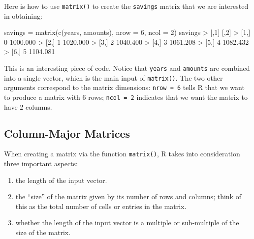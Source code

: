 \documentclass[
]{book}
\newenvironment{Shaded}{\begin{snugshade}}{\end{snugshade}}
\newcommand{\AttributeTok}[1]{\textcolor[rgb]{0.77,0.63,0.00}{#1}}
\newcommand{\DecValTok}[1]{\textcolor[rgb]{0.00,0.00,0.81}{#1}}
\newcommand{\FloatTok}[1]{\textcolor[rgb]{0.00,0.00,0.81}{#1}}
\newcommand{\FunctionTok}[1]{\textcolor[rgb]{0.00,0.00,0.00}{#1}}
\newcommand{\NormalTok}[1]{#1}
\newcommand{\OtherTok}[1]{\textcolor[rgb]{0.56,0.35,0.01}{#1}}
\newcommand{\SpecialCharTok}[1]{\textcolor[rgb]{0.00,0.00,0.00}{#1}}
\begin{document}
Here is how to use \texttt{matrix()} to create the \texttt{savings} matrix that we are
interested in obtaining:

\begin{Shaded}
\begin{Highlighting}[]
\NormalTok{savings }\OtherTok{=} \FunctionTok{matrix}\NormalTok{(}\FunctionTok{c}\NormalTok{(years, amounts), }\AttributeTok{nrow =} \DecValTok{6}\NormalTok{, }\AttributeTok{ncol =} \DecValTok{2}\NormalTok{)}
\NormalTok{savings}
\SpecialCharTok{\textgreater{}}\NormalTok{      [,}\DecValTok{1}\NormalTok{]     [,}\DecValTok{2}\NormalTok{]}
\SpecialCharTok{\textgreater{}}\NormalTok{ [}\DecValTok{1}\NormalTok{,]    }\DecValTok{0} \FloatTok{1000.000}
\SpecialCharTok{\textgreater{}}\NormalTok{ [}\DecValTok{2}\NormalTok{,]    }\DecValTok{1} \FloatTok{1020.000}
\SpecialCharTok{\textgreater{}}\NormalTok{ [}\DecValTok{3}\NormalTok{,]    }\DecValTok{2} \FloatTok{1040.400}
\SpecialCharTok{\textgreater{}}\NormalTok{ [}\DecValTok{4}\NormalTok{,]    }\DecValTok{3} \FloatTok{1061.208}
\SpecialCharTok{\textgreater{}}\NormalTok{ [}\DecValTok{5}\NormalTok{,]    }\DecValTok{4} \FloatTok{1082.432}
\SpecialCharTok{\textgreater{}}\NormalTok{ [}\DecValTok{6}\NormalTok{,]    }\DecValTok{5} \FloatTok{1104.081}
\end{Highlighting}
\end{Shaded}

This is an interesting piece of code. Notice that \texttt{years} and \texttt{amounts} are
combined into a single vector, which is the main input of \texttt{matrix()}. The two
other arguments correspond to the matrix dimensions: \texttt{nrow\ =\ 6} tells R that
we want to produce a matrix with 6 rows; \texttt{ncol\ =\ 2} indicates that we want the
matrix to have 2 columns.

\hypertarget{column-major-matrices}{%
\subsection{Column-Major Matrices}\label{column-major-matrices}}

When creating a matrix via the function \texttt{matrix()}, R takes into consideration
three important aspects:

\begin{enumerate}
\def\labelenumi{\arabic{enumi})}
\item
  the length of the input vector.
\item
  the ``size'' of the matrix given by its number of rows and columns; think of
  this as the total number of cells or entries in the matrix.
\item
  whether the length of the input vector is a multiple or sub-multiple of the
  size of the matrix.
\end{enumerate}
\end{document}
